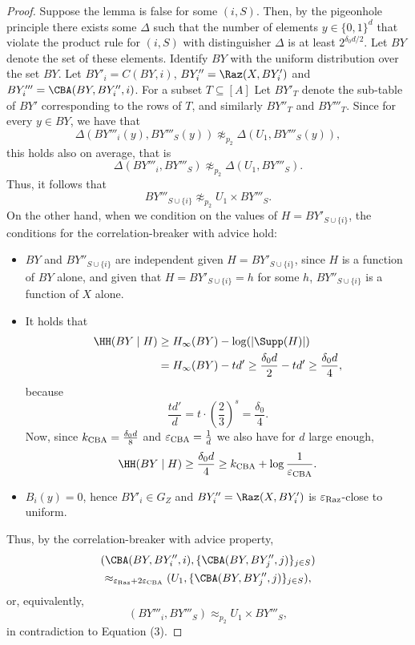 \begin{proof}
Suppose the lemma is false for some $(i,S)$. Then, by the pigeonhole principle there exists some $\Delta$ such that the number of elements $y\in\{0,1\}^d$ that violate the product rule for $(i,S)$ with distinguisher $\Delta$ is at least $2^{\delta_0d/2}$. Let $BY$ denote the set of these elements. Identify $BY$ with the uniform distribution over the set $BY$.
Let $BY'_i=C(BY,i)$, $BY''_i=\Raz(X,BY'_i)$ and $BY'''_i=\CBA(BY,BY''_i,i)$. For a subset $T\subseteq[A]$ Let $BY'_T$ denote the sub-table of $BY'$ corresponding to the rows of $T$, and similarly $BY''_T$ and $BY'''_T$. Since for every $y\in BY$, we have that
\[\Delta(BY'''_i(y),BY'''_S(y))\not\approx_{p_2}\Delta(U_1,BY'''_S(y)),\]
this holds also on average, that is
\[\Delta(BY'''_i,BY'''_S)\not\approx_{p_2}\Delta(U_1,BY'''_S).\]
Thus, it follows that
\begin{equation}BY'''_{S\cup\{i\}}\not\approx_{p_2}U_1\times BY'''_S.\tag{3}\label{eq:product}\end{equation}
On the other hand, when we condition on the values of $H=BY'_{S\cup\{i\}}$, the conditions for the correlation-breaker with advice hold:
\begin{itemize}
\item $BY$ and $BY''_{S\cup\{i\}}$ are independent given $H=BY'_{S\cup\{i\}}$, since $H$ is a function of $BY$ alone, and given that $H=BY'_{S\cup\{i\}}=h$ for some $h$, $BY''_{S\cup\{i\}}$ is a function of $X$ alone.
\item It holds that
\begin{align*}
\HH(BY\mid H)&\ge H_\infty(BY)-\log(|\Supp(H)|)\\
&=H_\infty(BY)-td'\ge\frac{\delta_0d}2-td'\ge\frac{\delta_0d}4,
\end{align*}
because
\[\frac{td'}d=t\cdot\left(\frac23\right)^s=\frac{\delta_0}4.\]
Now, since $k_{\rm CBA}=\frac{\delta_0d}8$ and $\varepsilon_{\rm CBA}=\frac1d$ we also have for $d$ large enough,
\[\HH(BY\mid H)\ge\frac{\delta_0d}4\ge k_{\rm CBA}+\log\frac1{\varepsilon_{\rm CBA}}.\]
\item $B_i(y)=0$, hence $BY'_i\in G_Z$ and $BY''_i=\Raz(X,BY'_i)$ is $\varepsilon_{\rm Raz}$-close to uniform.
\end{itemize}
Thus, by the correlation-breaker with advice property,
\begin{multline*}
(\CBA(BY,BY''_i,i),\{\CBA(BY,BY''_j,j)\}_{j\in S})\\
\approx_{\varepsilon_{\rm Raz}+2\varepsilon_{\rm CBA}}(U_1,\{\CBA(BY,BY''_j,j)\}_{j\in S}),
\end{multline*}
or, equivalently,
\[(BY'''_i,BY'''_S)\approx_{p_2}U_1\times BY'''_S,\]
in contradiction to Equation (3).
\end{proof}
